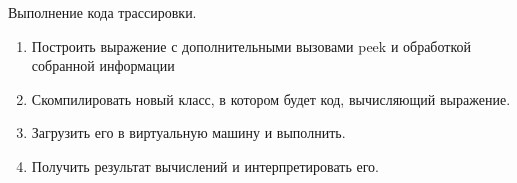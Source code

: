 \begin{frame}
\frametitle{\insertsection} 
\framesubtitle{\insertsubsection}
Выполнение кода трассировки.
\begin{enumerate}
	\item Построить выражение с дополнительными вызовами peek и обработкой собранной информации
	\item Скомпилировать новый класс, в котором будет код, вычисляющий выражение.
	\item Загрузить его в виртуальную машину и выполнить.
	\item Получить результат вычислений и интерпретировать его.
\end{enumerate}
\end{frame}
